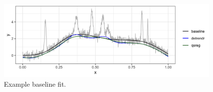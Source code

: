 \documentclass[]{article}
\begin{document}
\begin{figure}[h!]
	\caption{Example baseline fit.}
	\includegraphics[width = \linewidth]{Figures/ex_baseline.png}
\end{figure}


\pagebreak




\end{document}
